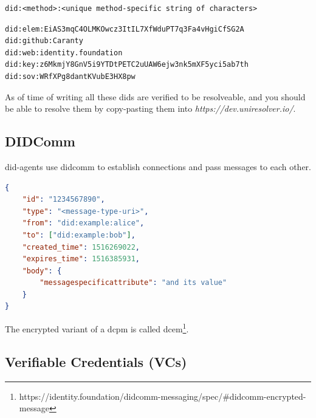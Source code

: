 \begin{lstlisting}[caption={DID-signature}]
did:<method>:<unique method-specific string of characters>
\end{lstlisting}

\begin{lstlisting}[caption={Depending on the DID-method, different DIDs may look very different from each other.}]
did:elem:EiAS3mqC4OLMKOwcz3ItIL7XfWduPT7q3Fa4vHgiCfSG2A
did:github:Caranty
did:web:identity.foundation
did:key:z6MkmjY8GnV5i9YTDtPETC2uUAW6ejw3nk5mXF5yci5ab7th
did:sov:WRfXPg8dantKVubE3HX8pw

\end{lstlisting}

As of time of writing all these \acrshort{dids} are verified to be resolveable, and you should be able to resolve them by copy-pasting them into \textit{https://dev.uniresolver.io/\cite{UniversalResolver}}.











\newpage

\subsection{DIDComm}

\acrshort{did}-agents use \acrshort{didcomm} to establish connections and pass messages to each other.


\begin{lstlisting}[language=json,caption={https://identity.foundation/didcomm-messaging/spec/\#plaintext-message-structure}]
{
    "id": "1234567890",
    "type": "<message-type-uri>",
    "from": "did:example:alice",
    "to": ["did:example:bob"],
    "created_time": 1516269022,
    "expires_time": 1516385931,
    "body": {
    	"messagespecificattribute": "and its value"
    }
}
\end{lstlisting}

The encrypted variant of a \acrshort{dcpm} is called \acrfull{dcem}\footnote{https://identity.foundation/didcomm-messaging/spec/\#didcomm-encrypted-message}.











\subsection{Verifiable Credentials (VCs)} 


